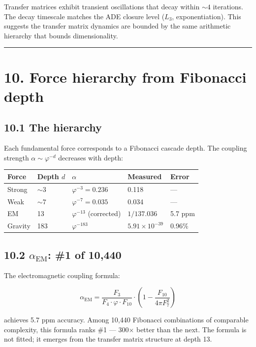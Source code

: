 \documentclass[11pt,a4paper]{article}
\begin{document}
Transfer matrices exhibit transient oscillations that decay within $\sim 4$ iterations. The decay timescale matches the ADE closure level ($L_3$, exponentiation). This suggests the transfer matrix dynamics are bounded by the same arithmetic hierarchy that bounds dimensionality.

\begin{center}\rule{0.5\linewidth}{0.4pt}\end{center}

\section*{10. Force hierarchy from Fibonacci depth}

\subsection*{10.1 The hierarchy}

Each fundamental force corresponds to a Fibonacci cascade depth. The coupling strength $\alpha \sim \varphi^{-d}$ decreases with depth:

\begin{longtable}[]{@{}lllll@{}}
\toprule
Force & Depth $d$ & $\alpha$ & Measured & Error \\
\midrule\endhead
Strong & $\sim 3$ & $\varphi^{-3} = 0.236$ & 0.118 & — \\
Weak & $\sim 7$ & $\varphi^{-7} = 0.035$ & 0.034 & — \\
EM & 13 & $\varphi^{-13}$ (corrected) & $1/137.036$ & 5.7 ppm \\
Gravity & 183 & $\varphi^{-183}$ & $5.91 \times 10^{-39}$ & 0.96\% \\
\bottomrule
\end{longtable}

\subsection*{10.2 $\alpha_{\text{EM}}$: \#1 of 10,440}

The electromagnetic coupling formula:

\[\alpha_{\text{EM}} = \frac{F_3}{F_4 \cdot \varphi \cdot F_{10}} \cdot \left(1 - \frac{F_{10}}{4\pi F_7^2}\right)\]

achieves 5.7 ppm accuracy. Among 10,440 Fibonacci combinations of comparable complexity, this formula ranks \#1 — 300$\times$ better than the next. The formula is not fitted; it emerges from the transfer matrix structure at depth 13.
\end{document}
